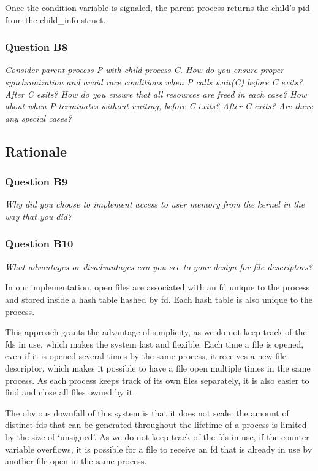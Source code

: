 Once the condition variable is signaled, the parent process returns the child's pid from the child\_info struct.

\subsubsection*{Question B8} %
\textit{Consider parent process P with child process C.  How do you ensure proper synchronization and avoid race conditions when P calls wait(C) before C exits?  After C exits?  How do you ensure that all resources are freed in each case?  How about when P terminates without waiting, before C exits?  After C exits?  Are there any special cases?}



\subsection{Rationale}

\subsubsection*{Question B9} %
\textit{Why did you choose to implement access to user memory from the kernel in the way that you did?}

\subsubsection*{Question B10} %
\textit{What advantages or disadvantages can you see to your design for file descriptors?}

In our implementation, open files are associated with an fd unique to the process and stored inside a hash table hashed by fd. Each hash table is also unique to the process.

This approach grants the advantage of simplicity, as we do not keep track of the fds in use, which makes the system fast and flexible.
Each time a file is opened, even if it is opened several times by the same process, it receives a new file descriptor, which makes it possible to have a file open multiple times in the same process.
As each process keeps track of its own files separately, it is also easier to find and close all files owned by it.

The obvious downfall of this system is that it does not scale: the amount of distinct fds that can be generated throughout the lifetime of a process is limited by the size of `unsigned'. As we do not keep track of the fds in use, if the counter variable overflows, it is possible for a file to receive an fd that is already in use by another file open in the same process.


